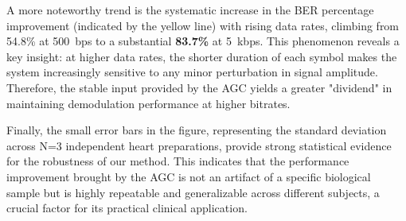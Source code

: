 \documentclass[journal]{IEEEtran}
\begin{document}
A more noteworthy trend is the systematic increase in the BER percentage improvement (indicated by the yellow line) with rising data rates, climbing from 54.8\% at \SI{500}{bps} to a substantial \textbf{83.7\%} at \SI{5}{kbps}. This phenomenon reveals a key insight: at higher data rates, the shorter duration of each symbol makes the system increasingly sensitive to any minor perturbation in signal amplitude. Therefore, the stable input provided by the AGC yields a greater "dividend" in maintaining demodulation performance at higher bitrates.

Finally, the small error bars in the figure, representing the standard deviation across N=3 independent heart preparations, provide strong statistical evidence for the robustness of our method. This indicates that the performance improvement brought by the AGC is not an artifact of a specific biological sample but is highly repeatable and generalizable across different subjects, a crucial factor for its practical clinical application.
%
%
\end{document}
